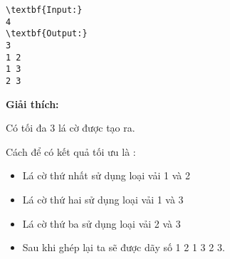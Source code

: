 \begin{verbatim}
\textbf{Input:}
4
\textbf{Output:}
3
1 2
1 3
2 3\end{verbatim}




\textbf{Giải thích:}

Có tối đa 3 lá cờ được tạo ra.


Cách để có kết quả tối ưu là :
\begin{itemize}
	\item Lá cờ thứ nhất sử dụng loại vải 1 và 2
	\item Lá cờ thứ hai sử dụng loại vải 1 và 3
	\item Lá cờ thứ ba sử dụng loại vải 2 và 3
	\item Sau khi ghép lại ta sẽ được dãy số 1 2 1 3 2 3.
\end{itemize}